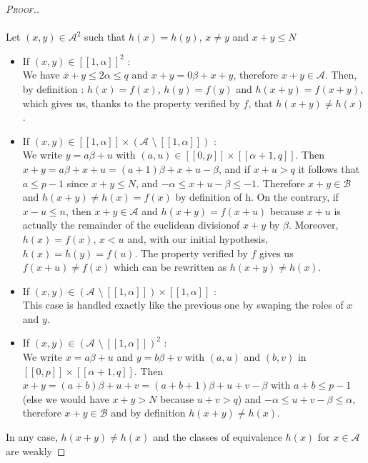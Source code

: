 \begin{proof}[\textsc{Proof.}]
\\
\\
Let \((x,y) \in \mathcal{A}^2\) such that \(h(x) = h(y)\), \(x \neq y\) and \(x + y \leqslant N\)
\begin{itemize}
	\item If \((x,y) \in [\![1,\alpha]\!]^2\) :\\
	We have \(x + y \leqslant 2\alpha \leqslant q\) and \(x + y = 0\beta + x + y\), therefore \(x + y \in \mathcal{A}\).
Then, by definition : \(h(x) = f(x)\), \(h(y) = f(y)\) and \(h(x+y) = f(x+y)\), which gives us, thanks to the property
verified by \(f\), that \(h(x+y) \neq h(x)\).
	\item If \((x,y) \in [\![1,\alpha]\!] \times ( \mathcal{A} \text{ \textbackslash} ~ [\![1,\alpha]\!] )\) :\\
We write \(y = a\beta + u\) with \((a,u) \in [\![0,p]\!] \times [\![\alpha + 1,q]\!]\). Then \(x+y = a\beta + x + u =
(a+1)\beta + x + u - \beta\),
and if \(x + u > q\) it follows that \(a \leqslant p-1\) since \(x+y \leqslant N\), and \(-\alpha \leqslant x + u -
\beta \leqslant -1\).
Therefore \(x+y \in \mathcal{B}\) and \(h(x+y) \neq h(x) = f(x)\) by definition of h. On the contrary, if \(x - u
\leqslant n\),
then \(x+y \in \mathcal{A}\) and \(h(x+y) = f(x+u)\) because \(x+u\) is actually the remainder of the euclidean
divisionof \(x+y\) by \(\beta\).
Moreover, \(h(x) = f(x)\), \(x < u\) and, with our initial hypothesis, \(h(x) = h(y) = f(u)\). The property verified by
\(f\) gives us \(f(x+u) \neq f(x)\) which can be rewritten as \(h(x+y) \neq h(x)\).
	\item If \((x,y) \in ( \mathcal{A} \text{ \textbackslash} ~ [\![1,\alpha]\!] ) \times [\![1,\alpha]\!]\) : \\
	This case is handled exactly like the previous one by swaping the roles of \(x\) and \(y\).
	\item If \((x,y) \in ( \mathcal{A} \text{ \textbackslash} ~ [\![1,\alpha]\!] )^2\) : \\
We write \(x = a\beta + u\) and \(y = b\beta + v\) with \((a,u)\) and \((b,v)\) in \([\![0,p]\!] \times [\![\alpha +
1,q]\!]\). Then \(x+y = (a+b)\beta + u+v = (a+b+1)\beta + u + v - \beta\)
with \(a+b \leqslant p-1\) (else we would have \(x+y > N\) because \(u+v > q\)) and \(-\alpha \leqslant u + v - \beta
\leqslant \alpha\), therefore \(x+y \in \mathcal{B}\) and by definition \(h(x+y) \neq h(x)\).
\end{itemize}
In any case, \(h(x+y) \neq h(x)\) and the classes of equivalence \(h(x)\) for \(x \in \mathcal{A}\) are weakly

\end{proof}
